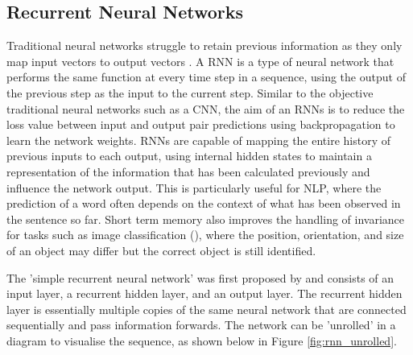 



\subsection{Recurrent Neural Networks}

Traditional neural networks struggle to retain previous information as they only map input vectors to output vectors \cite{graves_supervised_2012}. A \acrfull{RNN} is a type of neural network that performs the same function at every time step in a sequence, using the output of the previous step as the input to the current step.
Similar to the objective traditional neural networks such as a CNN, the aim of an \acrshort{RNN}s is to reduce the loss value between input and output pair predictions using backpropagation to learn the network weights. 
\acrshort{RNN}s are capable of mapping the entire history of previous inputs to each output, using internal hidden states to maintain a representation of the information that has been calculated previously and influence the network output.
This is particularly useful for \acrshort{NLP}, where the prediction of a word often depends on the context of what has been observed in the sentence so far. Short term memory also improves the handling of invariance for tasks such as image classification (\cite{mikolov_recurrent_slides_2010}), where the position, orientation, and size of an object may differ but the correct object is still identified. 






The 'simple recurrent neural network' was first proposed by \cite{elman_original_rnn_1990} and consists of an input layer, a recurrent hidden layer, and an output layer. The recurrent hidden layer is essentially multiple copies of the same neural network that are connected sequentially and pass information forwards. The network can be 'unrolled' in a diagram to visualise the sequence, as shown below in Figure \ref{fig:rnn_unrolled}.

